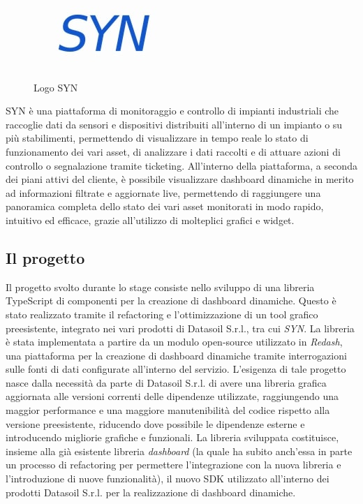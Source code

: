 \begin{figure}[H]
      \centering
      \includegraphics[alt={Logo SYN}, width=0.25\columnwidth]{img/syn_logo.jpg}
      \caption{Logo SYN}
      \label{fig:syn}
\end{figure}

SYN è una piattaforma di monitoraggio e controllo di impianti industriali che raccoglie dati da sensori e dispositivi
distribuiti all'interno di un impianto o su più stabilimenti, permettendo di visualizzare in tempo reale lo stato di
funzionamento dei vari asset, di analizzare i dati raccolti e di attuare azioni di controllo o segnalazione tramite
ticketing. All'interno della piattaforma, a seconda dei piani attivi del cliente, è possibile visualizzare dashboard dinamiche
in merito ad informazioni filtrate e aggiornate live, permettendo di raggiungere una panoramica completa dello stato dei vari
asset monitorati in modo rapido, intuitivo ed efficace, grazie all'utilizzo di molteplici grafici e widget.

\subsection{Il progetto}
Il progetto svolto durante lo stage consiste nello sviluppo di una libreria TypeScript di componenti per la creazione di dashboard dinamiche.
Questo è stato realizzato tramite il refactoring e l'ottimizzazione di un tool grafico preesistente, integrato nei vari prodotti di Datasoil S.r.l.,
tra cui \textit{SYN}. La libreria è stata implementata a partire da un modulo open-source utilizzato in \textit{Redash},
una piattaforma per la creazione di dashboard dinamiche tramite interrogazioni sulle fonti di dati configurate all'interno del servizio. \newline
L'esigenza di tale progetto nasce dalla necessità da parte di Datasoil S.r.l. di avere una libreria grafica aggiornata alle versioni
correnti delle dipendenze utilizzate, raggiungendo una maggior performance e una maggiore manutenibilità del codice rispetto alla versione
preesistente, riducendo dove possibile le dipendenze esterne e introducendo migliorie grafiche e funzionali. \newline
La libreria sviluppata costituisce, insieme alla già esistente libreria \textit{dashboard} (la quale ha subito anch'essa in parte un processo di refactoring
per permettere l'integrazione con la nuova libreria e l'introduzione di nuove funzionalità), il nuovo SDK utilizzato all'interno dei prodotti Datasoil S.r.l.
per la realizzazione di dashboard dinamiche.

